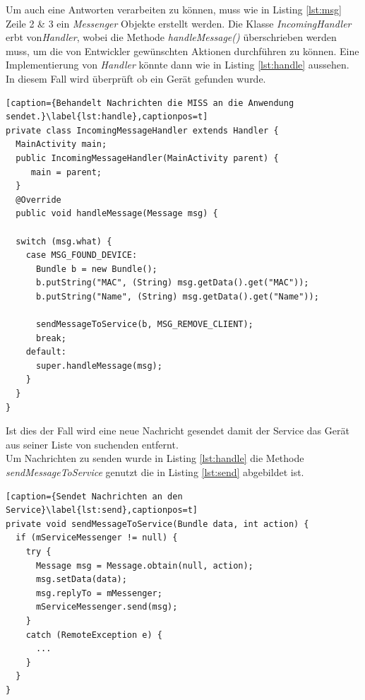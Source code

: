 \documentclass[]{report}
\begin{document}
 Um auch eine Antworten verarbeiten zu können, muss wie in Listing \ref{lst:msg} Zeile 2 \& 3 ein \textit{Messenger} Objekte erstellt werden. Die Klasse \textit{IncomingHandler} erbt von\textit{Handler}, wobei die Methode \textit{handleMessage()} überschrieben werden muss, um die von Entwickler gewünschten Aktionen durchführen zu können. Eine Implementierung von \textit{Handler} könnte dann wie in Listing \ref{lst:handle} aussehen. In diesem Fall wird überprüft ob ein Gerät gefunden wurde. 
\begin{lstlisting}[caption={Behandelt Nachrichten die MISS an die Anwendung sendet.}\label{lst:handle},captionpos=t] 
private class IncomingMessageHandler extends Handler {
  MainActivity main;
  public IncomingMessageHandler(MainActivity parent) {
     main = parent;
  }
  @Override
  public void handleMessage(Message msg) {
  
  switch (msg.what) {
    case MSG_FOUND_DEVICE:
	  Bundle b = new Bundle();
	  b.putString("MAC", (String) msg.getData().get("MAC"));
	  b.putString("Name", (String) msg.getData().get("Name"));
	  
	  sendMessageToService(b, MSG_REMOVE_CLIENT);
      break;
    default:
      super.handleMessage(msg);
    }
  }
}
\end{lstlisting}
Ist dies der Fall wird eine neue Nachricht gesendet damit der Service das Gerät aus seiner Liste von suchenden entfernt.\\
Um Nachrichten zu senden wurde in Listing \ref{lst:handle} die Methode \textit{sendMessageToService} genutzt die in Listing \ref{lst:send} abgebildet ist. 
\begin{lstlisting}[caption={Sendet Nachrichten an den Service}\label{lst:send},captionpos=t] 
private void sendMessageToService(Bundle data, int action) {
  if (mServiceMessenger != null) {
    try {
      Message msg = Message.obtain(null, action);
      msg.setData(data);
      msg.replyTo = mMessenger;
      mServiceMessenger.send(msg);
    } 
    catch (RemoteException e) {
      ...
    }
  }
}
\end{lstlisting}
\end{document}
